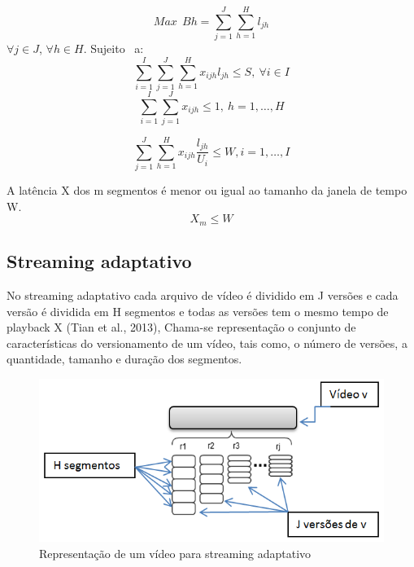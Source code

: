 \documentclass[
	12pt,				%
	oneside,			%
	a4paper,			%
	english,			%
	brazil				%
	]{abntex2ppgsi}
\begin{document}
\begin{equation}
Max  \ \ Bh=\sum_{j=1}^{J}\sum_{h=1}^{H}l_{jh}
\end{equation}\newline
$\forall j \in J$, $\forall h \in H.$
\newline
Sujeito \ a:
\begin{equation}
\sum_{i=1}^{I}\sum_{j=1}^{J}\sum_{h=1}^{H}x_{ijh}l_{jh} \leq S ,\ \forall i \in I
\end{equation}
\begin{equation}
\sum_{i=1}^{I}\sum_{j=1}^{J}x_{ijh} \leq 1 ,\ h = 1, \dots, H
\end{equation}

\begin{equation}
\sum_{j=1}^J\sum_{h=1}^{H}x_{ijh}\frac{l_{jh}}{U_i} \leq W ,i = 1, \dots, I
\end{equation}

A latência X dos m segmentos é menor ou igual ao tamanho da janela de tempo W.
\begin{equation}
X_m \leq W
\end{equation}


\subsection{Streaming adaptativo}

No streaming adaptativo cada arquivo de vídeo é dividido em J versões e cada versão é dividida em H segmentos e todas as versões tem o mesmo tempo de playback X (Tian et al., 2013), Chama-se representação o conjunto de características do versionamento de um vídeo, tais como, o número de versões, a quantidade, tamanho e duração dos segmentos.


\begin{figure}[H]%
	\centering
 	  \caption{Representação de um vídeo para streaming adaptativo}
		\includegraphics{figuras/segmentos.png}
\end{figure}
\end{document}
